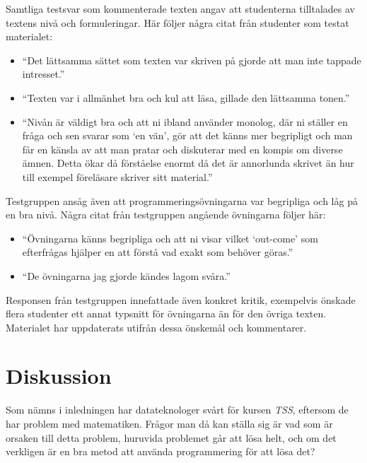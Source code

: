 \documentclass[12pt,a4paper,twoside,openright]{article}
\begin{document}
Samtliga testsvar som kommenterade texten angav att studenterna
tilltalades av textens nivå och formuleringar. Här följer några citat
från studenter som testat materialet:
\begin{itemize}
\item ``Det lättsamma sättet som texten var skriven på gjorde att man
 inte tappade intresset.''
\item ``Texten var i allmänhet bra och kul att läsa, gillade den
 lättsamma tonen.''
\item ``Nivån är väldigt bra och att ni ibland använder monolog, där
 ni ställer en fråga och sen svarar som `en vän', gör att det känns
 mer begripligt och man får en känsla av att man pratar och
 diskuterar med en kompis om diverse ämnen. Detta ökar då förståelse
 enormt då det är annorlunda skrivet än hur till exempel föreläsare
 skriver sitt material.''
\end{itemize}

Testgruppen ansåg även att programmeringsövningarna var begripliga och
låg på en bra nivå. Några citat från testgruppen angående övningarna
följer här:
\begin{itemize}
\item ``Övningarna känns begripliga och att ni visar vilket `out-come'
 som efterfrågas hjälper en att förstå vad exakt som behöver göras.''
\item ``De övningarna jag gjorde kändes lagom svåra.''
\end{itemize}

Responsen från testgruppen innefattade även konkret kritik, exempelvis
önskade flera studenter ett annat typsnitt för övningarna än för den
övriga texten. Materialet har uppdaterats utifrån dessa önskemål och
kommentarer.

\section{Diskussion}



Som nämns i inledningen har datateknologer
svårt för kursen \textit{TSS}, eftersom de har problem med
matematiken. Frågor man då kan ställa sig är vad som är orsaken till
detta problem, huruvida problemet går att lösa helt, och om det
verkligen är en bra metod att använda programmering för att lösa det?
\end{document}
